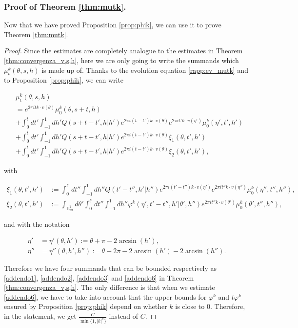 \documentclass[a4paper,10pt,reqno]{amsart}
\numberwithin{equation}{subsection}
\numberwithin{figure}{subsection}
\begin{document}
\subsubsection{\textbf{Proof of Theorem \ref{thm:mutk}.}} Now that we have proved Proposition \ref{prop:phik}, we can use it to prove Theorem \ref{thm:mutk}.
\begin{proof} Since the estimates are completely analogue to the estimates in Theorem \ref{thm:convergenza_v,s,h}, here we are only going to write the summands which $\mu_t^k(\theta,s,h)$ is made up of. Thanks to the evolution equation \eqref{rapp:ev_mutk} and to Proposition \ref{prop:phik}, we can write

\begin{align*}
&\mu_t^k(\theta,s,h)
\\
&=e^{2\pi itk\cdot v(\theta)}\mu_0^k(\theta,s+t,h)
\\
&+\int_0^tdt'\int_{-1}^1dh'Q(s+t-t',h|h')e^{2\pi i(t-t')k\cdot v(\theta)}e^{2\pi it' k\cdot v(\eta')}\mu_0^k(\eta',t',h')
\\
&+\int_0^tdt'\int_{-1}^1dh'Q(s+t-t',h|h')e^{2\pi i(t-t')k\cdot v(\theta)}\xi_1(\theta,t',h')
\\
&+\int_0^tdt'\int_{-1}^1dh'Q(s+t-t',h|h')e^{2\pi i(t-t')k\cdot v(\theta)}\xi_2(\theta,t',h'),
\end{align*}

with

{\footnotesize\begin{align*}
\xi_1(\theta,t',h')&:=\int_0^{t'}dt''\int_{-1}^1dh''Q(t'-t'',h'|h'') e^{2\pi i(t'-t'')k\cdot v(\eta')}e^{2\pi it''k\cdot v(\eta'')}\mu_0^k(\eta'',t'',h''),
\\
\xi_2(\theta,t',h')&:=\int_{\mathbb{T}^1_{2\pi}}d\theta'\int_0^{t'}dt''\int_{-1}^1dh'' \varphi^k(\eta',t'-t'',h'|\theta',h'')e^{2\pi it''k\cdot v(\theta')}\mu_0^k(\theta',t'',h''),
\end{align*}}

and with the notation

\begin{align*}
\eta'&=\eta'(\theta,h'):=\theta+\pi-2\arcsin(h'),
\\
\eta''&=\eta''(\theta,h',h''):=\theta+2\pi-2\arcsin(h')-2\arcsin(h'').
\end{align*}

Therefore we have four summands that can be bounded respectively as \eqref{addendo1}, \eqref{addendo2}, \eqref{addendo3} and \eqref{addendo6} in Theorem \ref{thm:convergenza_v,s,h}. The only difference is that when we estimate \eqref{addendo6}, we have to take into account that the upper bounds for $\varphi^k$ and $t\varphi^k$ ensured by Proposition \ref{prop:phik} depend on whether $k$ is close to $0$. Therefore, in the statement, we get $\frac{C}{\min\{1,|k|^6\}}$ instead of $C$.
\end{proof}
\end{document}
